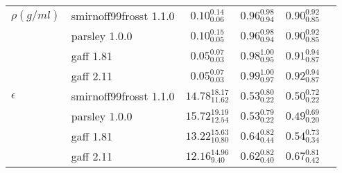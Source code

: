 \begin{tabular}{llcccc}
                         $\rho \left(g/ml\right)$ &  smirnoff99frosst 1.1.0 &     $0.10^{0.14}_{0.06}$ &  $0.96^{0.98}_{0.94}$ &   $0.90^{0.92}_{0.85}$ \\
                                                  &           parsley 1.0.0 &     $0.10^{0.15}_{0.05}$ &  $0.96^{0.98}_{0.94}$ &   $0.90^{0.92}_{0.85}$ \\
                                                  &               gaff 1.81 &     $0.05^{0.07}_{0.03}$ &  $0.98^{1.00}_{0.95}$ &   $0.91^{0.94}_{0.87}$ \\
                                                  &               gaff 2.11 &     $0.05^{0.07}_{0.03}$ &  $0.99^{1.00}_{0.97}$ &   $0.92^{0.94}_{0.87}$ \\
                                       $\epsilon$ &  smirnoff99frosst 1.1.0 &  $14.78^{18.17}_{11.62}$ &  $0.53^{0.80}_{0.22}$ &   $0.50^{0.72}_{0.22}$ \\
                                                  &           parsley 1.0.0 &  $15.72^{19.19}_{12.54}$ &  $0.53^{0.79}_{0.22}$ &   $0.49^{0.69}_{0.20}$ \\
                                                  &               gaff 1.81 &  $13.22^{15.63}_{10.80}$ &  $0.64^{0.82}_{0.44}$ &   $0.54^{0.73}_{0.34}$ \\
                                                  &               gaff 2.11 &   $12.16^{14.96}_{9.40}$ &  $0.62^{0.82}_{0.40}$ &   $0.67^{0.81}_{0.42}$ \\
\bottomrule
\end{tabular}
